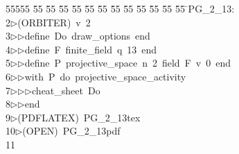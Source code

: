 %
%
\begin{tabbing}
55555 \= 55 \= 55 \= 55 \= 55 \= 55 \= 55 \= 55 \= 55 \= 55 \= 55 \= 55 \= 55 \= \>PG\_2\_13:\\[0pt]
2\>$\triangleright$\>(ORBITER)\ v\ 2\ \\[0pt]
3\>$\triangleright$\>$\triangleright$\>define\ Do\ draw\_options\ end\ \\[0pt]
4\>$\triangleright$\>$\triangleright$\>define\ F\ finite\_field\ q\ 13\ end\ \\[0pt]
5\>$\triangleright$\>$\triangleright$\>define\ P\ projective\_space\ n\ 2\ field\ F\ v\ 0\ end\ \\[0pt]
6\>$\triangleright$\>$\triangleright$\>with\ P\ do\ projective\_space\_activity\ \\[0pt]
7\>$\triangleright$\>$\triangleright$\>$\triangleright$\>cheat\_sheet\ Do\ \\[0pt]
8\>$\triangleright$\>$\triangleright$\>end\\[0pt]
9\>$\triangleright$\>(PDFLATEX)\ PG\_2\_13tex\ \\[0pt]
10\>$\triangleright$\>(OPEN)\ PG\_2\_13pdf\\[0pt]
11\>\end{tabbing}

